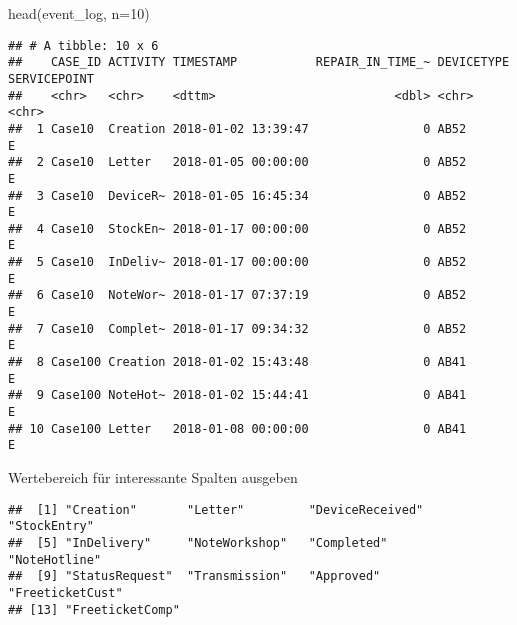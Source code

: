 \documentclass[
]{article}
\newenvironment{Shaded}{\begin{snugshade}}{\end{snugshade}}
\newcommand{\AttributeTok}[1]{\textcolor[rgb]{0.77,0.63,0.00}{#1}}
\newcommand{\DecValTok}[1]{\textcolor[rgb]{0.00,0.00,0.81}{#1}}
\newcommand{\FunctionTok}[1]{\textcolor[rgb]{0.00,0.00,0.00}{#1}}
\newcommand{\NormalTok}[1]{#1}
\newcommand{\SpecialCharTok}[1]{\textcolor[rgb]{0.00,0.00,0.00}{#1}}
\begin{document}
\begin{Shaded}
\begin{Highlighting}[]
\FunctionTok{head}\NormalTok{(event\_log, }\AttributeTok{n=}\DecValTok{10}\NormalTok{)}
\end{Highlighting}
\end{Shaded}

\begin{verbatim}
## # A tibble: 10 x 6
##    CASE_ID ACTIVITY TIMESTAMP           REPAIR_IN_TIME_~ DEVICETYPE SERVICEPOINT
##    <chr>   <chr>    <dttm>                         <dbl> <chr>      <chr>       
##  1 Case10  Creation 2018-01-02 13:39:47                0 AB52       E           
##  2 Case10  Letter   2018-01-05 00:00:00                0 AB52       E           
##  3 Case10  DeviceR~ 2018-01-05 16:45:34                0 AB52       E           
##  4 Case10  StockEn~ 2018-01-17 00:00:00                0 AB52       E           
##  5 Case10  InDeliv~ 2018-01-17 00:00:00                0 AB52       E           
##  6 Case10  NoteWor~ 2018-01-17 07:37:19                0 AB52       E           
##  7 Case10  Complet~ 2018-01-17 09:34:32                0 AB52       E           
##  8 Case100 Creation 2018-01-02 15:43:48                0 AB41       E           
##  9 Case100 NoteHot~ 2018-01-02 15:44:41                0 AB41       E           
## 10 Case100 Letter   2018-01-08 00:00:00                0 AB41       E
\end{verbatim}

Wertebereich für interessante Spalten ausgeben

\begin{Shaded}
\end{Shaded}

\begin{verbatim}
##  [1] "Creation"       "Letter"         "DeviceReceived" "StockEntry"    
##  [5] "InDelivery"     "NoteWorkshop"   "Completed"      "NoteHotline"   
##  [9] "StatusRequest"  "Transmission"   "Approved"       "FreeticketCust"
## [13] "FreeticketComp"
\end{verbatim}

\begin{Shaded}
\end{Shaded}
\end{document}
